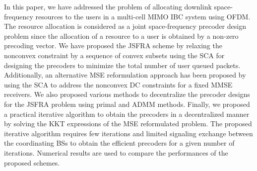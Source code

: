 In this paper, we have addressed the problem of allocating downlink space-frequency resources to the users in a multi-cell \ac{MIMO} \ac{IBC} system using \ac{OFDM}. The resource allocation is considered as a joint space-frequency precoder design problem since the allocation of a resource to a user is obtained by a non-zero precoding vector. We have proposed the \ac{JSFRA} scheme by relaxing the nonconvex constraint by a sequence of convex subsets using the \ac{SCA} for designing the precoders to minimize the total number of user queued packets. Additionally, an alternative \ac{MSE} reformulation approach has been proposed by using the \ac{SCA} to address the nonconvex \ac{DC} constraints for a fixed \ac{MMSE} receivers. We also proposed various methods to decentralize the precoder designs for the \ac{JSFRA} problem using primal and \ac{ADMM} methods. Finally, we proposed a practical iterative algorithm to obtain the precoders in a decentralized manner by solving the \ac{KKT} expressions of the \ac{MSE} reformulated problem. The proposed iterative algorithm requires few iterations and limited signaling exchange between the coordinating \acp{BS} to obtain the efficient precoders for a given number of iterations. Numerical results are used to compare the performances of the proposed schemes.